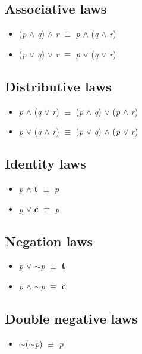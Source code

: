 \documentclass{article}
\begin{document}
\subsection{Associative laws}
\begin{itemize}
\item (\textit{p} $\wedge$ \textit{q}) $\wedge$ \textit{r} $\equiv$ \textit{p} $\wedge$ (\textit{q} $\wedge$ \textit{r})
\item (\textit{p} $\lor$ \textit{q}) $\lor$ \textit{r} $\equiv$ \textit{p} $\lor$ (\textit{q} $\lor$ \textit{r})
\end{itemize}

\subsection{Distributive laws}
\begin{itemize}
\item \textit{p} $\wedge$ (\textit{q} $\lor$ \textit{r}) $\equiv$ (\textit{p} $\wedge$ \textit{q}) $\lor$ (\textit{p} $\wedge$ \textit{r})
\item \textit{p} $\lor$ (\textit{q} $\wedge$ \textit{r}) $\equiv$ (\textit{p} $\lor$ \textit{q}) $\wedge$ (\textit{p} $\lor$ \textit{r})
\end{itemize}

\subsection{Identity laws}
\begin{itemize}
\item \textit{p} $\wedge$ \textbf{t} $\equiv$ \textit{p}
\item \textit{p} $\lor$ \textbf{c} $\equiv$ \textit{p}
\end{itemize}

\subsection{Negation laws}
\begin{itemize}
\item \textit{p} $\lor$ $\sim$\textit{p} $\equiv$ \textbf{t}
\item \textit{p} $\wedge$ $\sim$\textit{p} $\equiv$ \textbf{c}
\end{itemize}

\subsection{Double negative laws}
\begin{itemize}
\item $\sim$($\sim$\textit{p}) $\equiv$ \textit{p}
\end{itemize}
\end{document}
